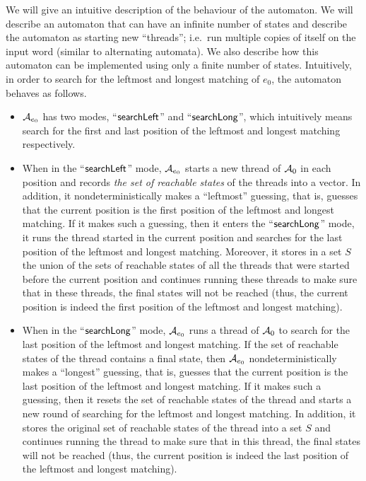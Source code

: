 %
We will give an intuitive description of the behaviour of the automaton.
We will describe an automaton that can have an infinite number of states and describe the automaton as starting new ``threads''; i.e.\ run multiple copies of itself on the input word (similar to alternating automata).
We also describe how this automaton can be implemented using only a finite number of states.
Intuitively, in order to search for the leftmost and longest matching of $e_0$, the automaton behaves as follows.
\begin{itemize}
\item $\mathcal{A}_{e_0}$ has two modes, ``$\mathsf{searchLeft}$'' and ``$\mathsf{searchLong}$'', which intuitively means search for the first and last position of the leftmost and longest matching respectively.
	\item When in the ``$\mathsf{searchLeft}$'' mode, $\mathcal{A}_{e_0}$ starts a new thread of $\mathcal{A}_0$ in each position and records \emph{the set of reachable states} of the threads into a vector. 
    In addition, it nondeterministically makes a ``leftmost'' guessing, that is, guesses that the current position is the first position of the leftmost and longest matching. 
    If it makes such a guessing, then it enters the ``$\mathsf{searchLong}$'' mode, it runs the thread started in the current position and searches for the last position of the leftmost and longest matching. 
    Moreover, it stores in a set $S$ the union of the sets of reachable states of all the threads that were started before the current position and continues running these threads to make sure that in these threads, the final states will not be reached (thus, the current position is indeed the first position of the leftmost and longest matching).
	\item When in the ``$\mathsf{searchLong}$'' mode, $\mathcal{A}_{e_0}$ runs a thread of $\mathcal{A}_{0}$ to search for the last position of the leftmost and longest matching. 
    If the set of reachable states of the thread contains a final state, then $\mathcal{A}_{e_0}$ nondeterministically makes a ``longest'' guessing, that is, guesses that the current position is the last position of the leftmost and longest matching. 
    If it makes such a guessing, then it resets the set of reachable states of the thread and starts a new round of searching for the leftmost and longest matching. 
    In addition, it stores the original set of reachable states of the thread into a set $S$ and continues running the thread to make sure that in this thread, the final states  will not be reached (thus, the current position is indeed the last position of the leftmost and longest matching).

\end{itemize}
